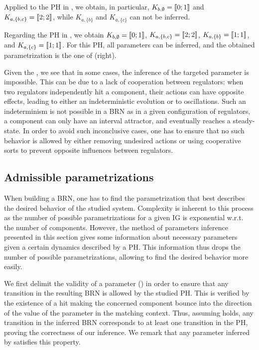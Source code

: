 \begin{example}
\label{ex:infer-param-runningPH-1}
Applied to the PH in , we obtain, in particular,
$K_{b,\emptyset} = \llbracket 0 ; 1 \rrbracket$ and
$K_{a,\{b,c\}} = \llbracket 2 ; 2 \rrbracket$,
while $K_{a,\{b\}}$ and $K_{a,\{c\}}$ can not be inferred.
\end{example}

\begin{example}
Regarding the PH in , we obtain
$K_{b,\emptyset} = \llbracket 0 ; 1 \rrbracket$,
$K_{a,\{b,c\}} = \llbracket 2 ; 2 \rrbracket$,
$K_{a,\{b\}} = \llbracket 1 ; 1 \rrbracket$,
and $K_{a,\{c\}} = \llbracket 1 ; 1 \rrbracket$.
For this PH, all parameters can be inferred, and the obtained parametrization is the one of (right).
\end{example}

Given the , we see that in some cases, the inference of the targeted parameter is impossible.
This can be due to a lack of cooperation between regulators: when two regulators independently hit a component, their actions can have opposite effects, leading to either an indeterministic evolution or to oscillations.
Such an indeterminism is not possible in a BRN as in a given configuration of regulators, a component can only have an interval attractor, and eventually reaches a steady-state.
In order to avoid such inconclusive cases, one has to ensure that no such behavior is allowed by
either removing undesired actions or using cooperative sorts to prevent opposite influences between
regulators.

\subsection{Admissible parametrizations}\label{ssec:admissible-K}

When building a BRN, one has to find the parametrization that best describes the desired behavior of the studied system.
Complexity is inherent to this process as the number of possible parametrizations for a given IG is exponential w.r.t. the number of components.
However, the method of parameters inference presented in this section gives some information about necessary parameters given a certain dynamics described by a PH.
This information thus drops the number of possible parametrizations, allowing to find the desired behavior more easily.

We first delimit the validity of a parameter () in order to ensure that any
transition in the resulting BRN is allowed by the studied PH.
This is verified by the existence of a hit making the concerned component bounce into the direction
of the value of the parameter in the matching context.
Thus, assuming  holds, any transition in the inferred BRN corresponds to at least
one transition in the PH, proving the correctness of our inference.
We remark that any parameter inferred by  satisfies this property.

